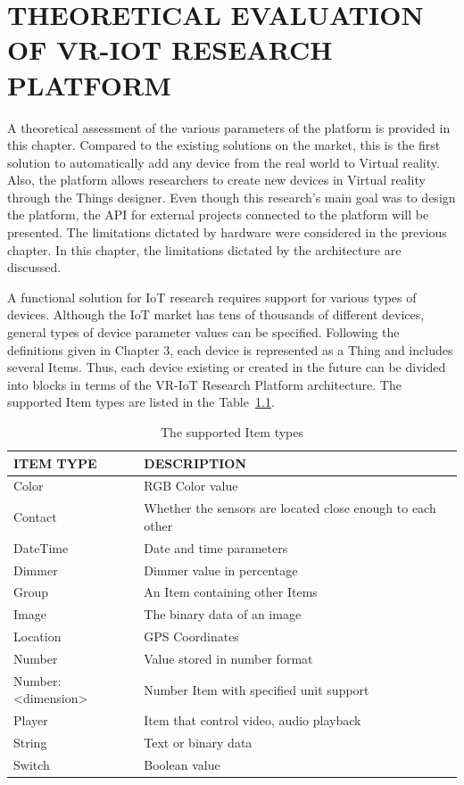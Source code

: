 
\chapter{THEORETICAL EVALUATION OF VR-IOT RESEARCH PLATFORM}

A theoretical assessment of the various parameters of the platform is provided in this chapter. Compared to the existing solutions on the market, this is the first solution to automatically add any device from the real world to Virtual reality. Also, the platform allows researchers to create new devices in Virtual reality through the Things designer. Even though this research's main goal was to design the platform, the API for external projects connected to the platform will be presented. The limitations dictated by hardware were considered in the previous chapter. In this chapter, the limitations dictated by the architecture are discussed.

A functional solution for IoT research requires support for various types of devices. Although the IoT market has tens of thousands of different devices, general types of device parameter values ​​can be specified. Following the definitions given in Chapter 3, each device is represented as a Thing and includes several Items. Thus, each device existing or created in the future can be divided into blocks in terms of the VR-IoT Research Platform architecture. The supported Item types are listed in the Table~\ref{tab:items-table}.

\begin{table}
  \centering
  \begin{threeparttable}[c]
    \caption{The supported Item types}
    \label{tab:items-table}
    \begin{tabular}{ll}
      \toprule
      ITEM TYPE    &         DESCRIPTION                 \\
      \midrule
      Color &	RGB Color value \\
      Contact & Whether the sensors are located close enough to each other \\
      DateTime & Date and time parameters \\
      Dimmer &	Dimmer value in percentage \\
      Group &	An Item containing other Items \\
      Image &	The binary data of an image \\
      Location & GPS Coordinates \\
      Number & Value stored in number format \\
      Number:<dimension> & Number Item with specified unit support \\
      Player & Item that control video, audio playback \\
      String &	Text or binary data \\
      Switch & Boolean value \\
      \bottomrule
    \end{tabular}
  \end{threeparttable}
\end{table}

